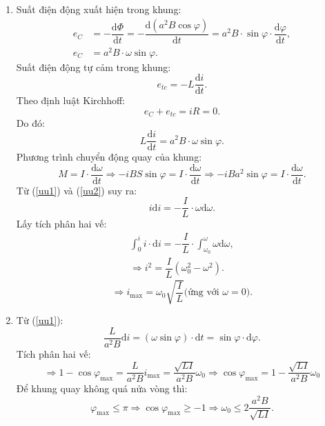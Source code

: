 \begin{loigiai}\[\]
\begin{enumerate}[1)]
    \item 
Suất điện động xuất hiện trong khung:
\[
\begin{aligned}
e_{C} &= -\dfrac{\mathrm{d} \Phi}{\mathrm{d} t}=-\dfrac{\mathrm{d}\left(a^{2} B \cos \varphi\right)}{\mathrm{d} t} = a^{2} B \cdot \sin \varphi \cdot \dfrac{\mathrm{d} \varphi}{\mathrm{d} t}, \\
e_{C} &= a^{2} B \cdot \omega \sin \varphi.
\end{aligned}
\]
Suất điện động tự cảm trong khung:
\[
e_{tc}=-L \dfrac{\mathrm{d} i}{\mathrm{d} t}.
\]
Theo định luật Kirchhoff:
\[e_{C}+e_{t c}=iR=0.\] 
Do đó:
\[
L \dfrac{\mathrm{d} i}{\mathrm{d} t}=a^{2} B \cdot \omega \sin \varphi. \tag{1} \label{uu1}
\]
Phương trình chuyển động quay của khung:
\[
M = I \cdot \dfrac{\mathrm{d} \omega}{\mathrm{d} t} \Rightarrow -i B S \sin \varphi = I \cdot \dfrac{\mathrm{d} \omega}{\mathrm{d} t} \Rightarrow - i B a^{2} \sin \varphi = I \cdot \dfrac{\mathrm{d} \omega}{\mathrm{d} t}. \tag{2} \label{uu2}
\]
Từ (\ref{uu1}) và (\ref{uu2}) suy ra:
\[i \mathrm{d}i=-\dfrac{I}{L} \cdot \omega \mathrm{d} \omega.\]
Lấy tích phân hai vế:
\begin{align*}
\int_{0}^{i} i \cdot \mathrm{d} i=-\dfrac{I}{L} \cdot \int_{\omega_{0}}^{\omega} \omega \mathrm{d} \omega,\\
\Rightarrow i^{2}=\dfrac{I}{L}\left(\omega_{0}^{2}-\omega^{2}\right).  
\end{align*}
\[\Rightarrow i_{\max }=\omega_{0} \sqrt{\dfrac{I}{L}}\text{(ứng với $\omega=0$).}\]
\item Từ (\ref{uu1}):
\[\dfrac{L}{a^{2} B} \mathrm{d} i=(\omega \sin \varphi) \cdot \mathrm{d} t=\sin \varphi \cdot \mathrm{d} \varphi.\]
Tích phân hai vế:
\[\Rightarrow 1-\cos \varphi_{\max }=\dfrac{L}{a^{2} B} i_{\max }=\dfrac{\sqrt{L I}}{a^{2} B} \omega_{0} \Rightarrow \cos \varphi_{\max }=1-\dfrac{\sqrt{L I}}{a^{2} B} \omega_{0}\]
Để khung quay không quá nửa vòng thì:
\[\varphi_{\max } \leq \pi \Rightarrow \cos \varphi_{\max } \geq-1 \Rightarrow \omega_{0} \leq 2\dfrac{a^{2} B}{\sqrt{L I}}.\]
\end{enumerate}
\end{loigiai}
